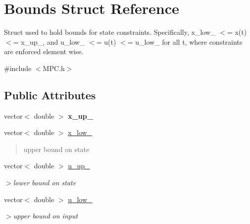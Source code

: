 \hypertarget{structBounds}{}\section{Bounds Struct Reference}
\label{structBounds}


Struct used to hold bounds for state constraints. Specifically, x\+\_\+low\+\_\+ $<$= x(t) $<$= x\+\_\+up\+\_\+, and u\+\_\+low\+\_\+ $<$= u(t) $<$= u\+\_\+low\+\_\+ for all t, where constraints are enforced element wise.  




{\ttfamily \#include $<$M\+P\+C.\+h$>$}

\subsection*{Public Attributes}
\begin{DoxyCompactItemize}
\item 
\mbox{\label{structBounds_a8f7b9d25cb5bb2b4ee88529513e23a3e}} 
vector$<$ double $>$ {\bfseries x\+\_\+up\+\_\+}
\item 
\mbox{\label{structBounds_a658b0e4cff906d8cd49b4fb046f2c88d}} 
vector$<$ double $>$ \mbox{\hyperlink{structBounds_a658b0e4cff906d8cd49b4fb046f2c88d}{x\+\_\+low\+\_\+}}
\begin{DoxyCompactList}\small\item\em \begin{quote}
upper bound on state\end{quote}
\end{DoxyCompactList}\item 
\mbox{\label{structBounds_aa7c73f1b4637567434bd30e728af4ef7}} 
vector$<$ double $>$ \mbox{\hyperlink{structBounds_aa7c73f1b4637567434bd30e728af4ef7}{u\+\_\+up\+\_\+}}
\begin{DoxyCompactList}\small\item\em $>$lower bound on state \end{DoxyCompactList}\item 
\mbox{\label{structBounds_a27da76ce0173dcac40b077c2d23c7236}} 
vector$<$ double $>$ \mbox{\hyperlink{structBounds_a27da76ce0173dcac40b077c2d23c7236}{u\+\_\+low\+\_\+}}
\begin{DoxyCompactList}\small\item\em $>$upper bound on input \end{DoxyCompactList}\end{DoxyCompactItemize}


